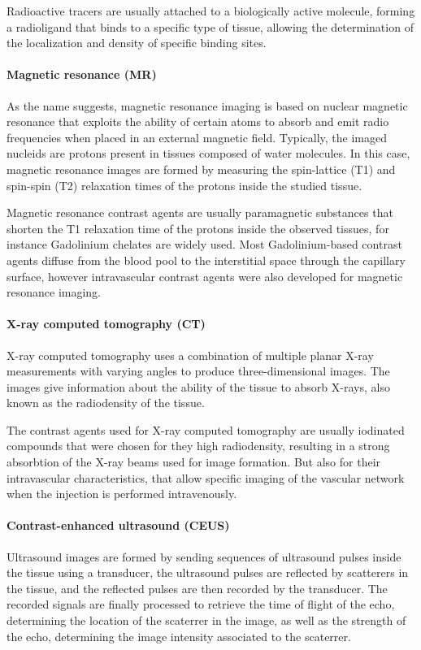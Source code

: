 Radioactive tracers are usually attached to a biologically active molecule, forming a radioligand that binds to a specific type of tissue, allowing the determination of the localization and density of specific binding sites.

\paragraph{Magnetic resonance (MR)}
\label{sec:IntroMR}
As the name suggests, magnetic resonance imaging is based on nuclear magnetic resonance that exploits the ability of certain atoms to absorb and emit radio frequencies when placed in an external magnetic field.
Typically, the imaged nucleids are protons present in tissues composed of water molecules.
In this case, magnetic resonance images are formed by measuring the spin-lattice (T1) and spin-spin (T2) relaxation times of the protons inside the studied tissue.

Magnetic resonance contrast agents are usually paramagnetic substances that shorten the T1 relaxation time of the protons inside the observed tissues, for instance Gadolinium chelates are widely used.
Most Gadolinium-based contrast agents diffuse from the blood pool to the interstitial space through the capillary surface, however intravascular contrast agents were also developed for magnetic resonance imaging.

\paragraph{X-ray computed tomography (CT)}
\label{sec:IntroCT}
X-ray computed tomography uses a combination of multiple planar X-ray measurements with varying angles to produce three-dimensional images.
The images give information about the ability of the tissue to absorb X-rays, also known as the radiodensity of the tissue. 

The contrast agents used for X-ray computed tomography are usually iodinated compounds that were chosen for they high radiodensity, resulting in a strong absorbtion of the X-ray beams used for image formation.
But also for their intravascular characteristics, that allow specific imaging of the vascular network when the injection is performed intravenously.

\paragraph{Contrast-enhanced ultrasound (CEUS)}
\label{sec:IntroCEUS}
Ultrasound images are formed by sending sequences of ultrasound pulses inside the tissue using a transducer, the ultrasound pulses are reflected by scatterers in the tissue, and the reflected pulses are then recorded by the transducer.
The recorded signals are finally processed to retrieve the time of flight of the echo, determining the location of the scaterrer in the image, as well as the strength of the echo, determining the image intensity associated to the scaterrer.

